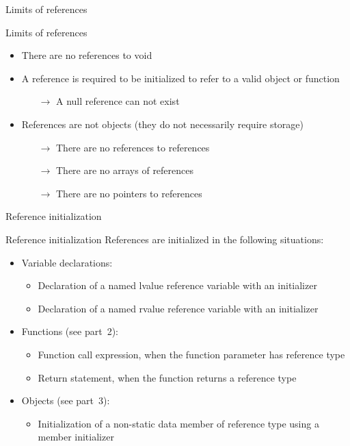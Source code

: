 \begin{frame}{Limits of references}{}
  \begin{block}{Limits of references}
    \begin{itemize}
    \item
      There are no references to void
    \item
      A reference is required to be initialized to refer to a valid object or function
      \begin{itemize}
      \item[$\to$]
        A null reference can not exist
      \end{itemize}
    \item
      References are not objects (they do not necessarily require storage)
      \begin{itemize}
      \item[$\to$]
        There are no references to references
      \item[$\to$]
        There are no arrays of references
      \item[$\to$]
        There are no pointers to references
      \end{itemize}
    \end{itemize}
  \end{block}
\end{frame}

\begin{frame}{Reference initialization}{}
  \begin{block}{Reference initialization}
    References are initialized in the following situations:
    \begin{itemize}
    \item
      Variable declarations:
      \begin{itemize}
      \item
        Declaration of a named lvalue reference variable with an initializer
      \item
        Declaration of a named rvalue reference variable with an initializer
      \end{itemize}
    \item
      Functions (see part~2): %
      \begin{itemize}
      \item
        Function call expression, when the function parameter has reference type
      \item
        Return statement, when the function returns a reference type
      \end{itemize}
    \item
      Objects (see part~3): %
      \begin{itemize}
      \item
         Initialization of a non-static data member of reference type using a member initializer
      \end{itemize}
    \end{itemize}
  \end{block}
\end{frame}



